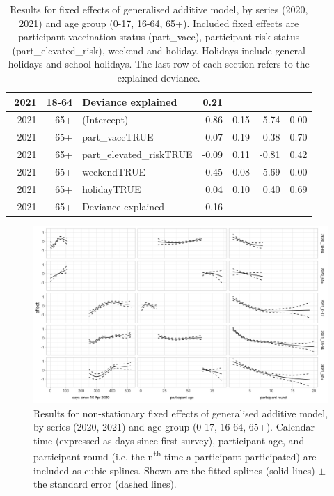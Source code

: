 \documentclass[fleqn,10pt]{wlscirep}
\begin{document}
\begin{table}[ht]
\begin{tabular}{rrlrrrr}
$$  2021 & 18-64 & Deviance explained & 0.21 &  &  &  \\ 
  \hline 
  2021 & 65+ & (Intercept) & -0.86 & 0.15 & -5.74 & 0.00 \\ 
  2021 & 65+ & part\_vaccTRUE & 0.07 & 0.19 & 0.38 & 0.70 \\ 
  2021 & 65+ & part\_elevated\_riskTRUE & -0.09 & 0.11 & -0.81 & 0.42 \\ 
  2021 & 65+ & weekendTRUE & -0.45 & 0.08 & -5.69 & 0.00 \\ 
  2021 & 65+ & holidayTRUE & 0.04 & 0.10 & 0.40 & 0.69 \\ 
  2021 & 65+ & Deviance explained & 0.16 &  &  &  \\ 
   \hline
\end{tabular}
\caption{\label{tab:fixed_effects}Results for fixed effects of generalised additive model, by series (2020, 2021) and age group (0-17, 16-64, 65+). Included fixed effects are participant vaccination status (part\_vacc), participant risk status (part\_elevated\_risk), weekend and holiday. Holidays include general holidays and school holidays. The last row of each section refers to the explained deviance. } 
\end{table}

\begin{figure}[ht]
\centering
\includegraphics[width=\linewidth]{../figures/results_splines.png}
\caption{Results for non-stationary fixed effects of generalised additive model, by series (2020, 2021) and age group (0-17, 16-64, 65+). Calendar time (expressed as days since first survey), participant age, and participant round (i.e. the n\textsuperscript{th} time a participant participated) are included as cubic splines. Shown are the fitted splines (solid lines) $\pm$ the standard error (dashed lines).}
\label{fig:splines}
\end{figure}
\end{document}
